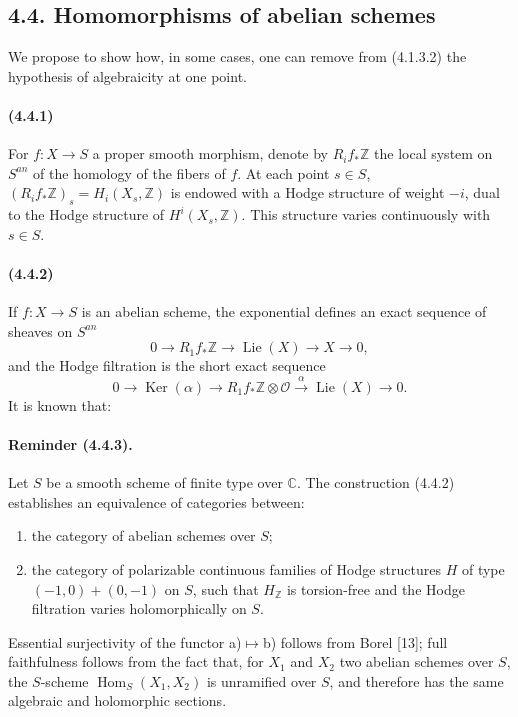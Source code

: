 \documentclass[10pt]{article}
\newcommand{\C}{\mathbb C}
\newcommand{\Z}{\mathbb Z}
\newcommand{\Ker}{\operatorname{Ker}}
\newcommand{\Hom}{\operatorname{Hom}}
\providecommand{\Lie}{\operatorname{Lie}}
\providecommand{\cO}{\mathcal O}
\providecommand{\cO}{\mathcal O}
\begin{document}
\subsection*{4.4. Homomorphisms of abelian schemes}

We propose to show how, in some cases, one can remove from (4.1.3.2) the hypothesis of algebraicity at one point.

\paragraph{(4.4.1)} For $f:X\to S$ a proper smooth morphism, denote by $R_if_*\Z$ the local system on $S^{an}$ of the homology of the fibers of $f$. At each point $s\in S$, $(R_if_*\Z)_s=H_i(X_s,\Z)$ is endowed with a Hodge structure of weight $-i$, dual to the Hodge structure of $H^i(X_s,\Z)$. This structure varies continuously with $s\in S$.

\paragraph{(4.4.2)} If $f:X\to S$ is an abelian scheme, the exponential defines an exact sequence of sheaves on $S^{an}$
\[
0\to R_1f_*\Z\to\Lie(X)\to X\to0,
\]
and the Hodge filtration is the short exact sequence
\[
0\to\Ker(\alpha)\to R_1f_*\Z\otimes\cO\xrightarrow{\alpha}\Lie(X)\to0.
\]
It is known that:

\paragraph{Reminder (4.4.3).} Let $S$ be a smooth scheme of finite type over $\C$. The construction (4.4.2) establishes an equivalence of categories between:
\begin{enumerate}[label=\alph*)]
\item the category of abelian schemes over $S$;
\item the category of polarizable continuous families of Hodge structures $H$ of type $(-1,0)+(0,-1)$ on $S$, such that $H_\Z$ is torsion-free and the Hodge filtration varies holomorphically on $S$.
\end{enumerate}
Essential surjectivity of the functor a)$\mapsto$b) follows from Borel [13]; full faithfulness follows from the fact that, for $X_1$ and $X_2$ two abelian schemes over $S$, the $S$-scheme $\Hom_S(X_1,X_2)$ is unramified over $S$, and therefore has the same algebraic and holomorphic sections.
\end{document}
